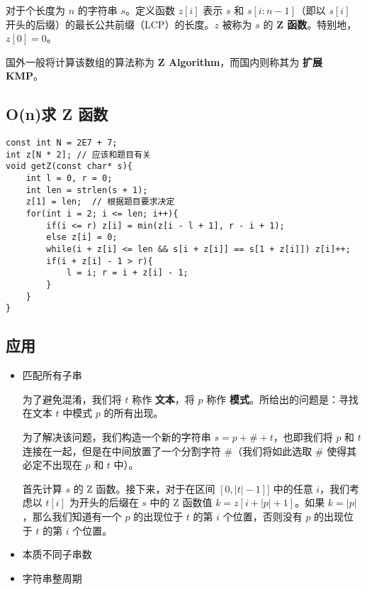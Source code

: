 对于个长度为 $n$ 的字符串 $s$。定义函数 $z[i]$ 表示 $s$ 和 $s[i:n-1]$（即以 $s[i]$ 开头的后缀）的最长公共前缀（LCP）的长度。$z$ 被称为 $s$ 的 \textbf{Z 函数}。特别地，$z[0] = 0$。

国外一般将计算该数组的算法称为 \textbf{Z Algorithm}，而国内则称其为 \textbf{扩展 KMP}。

\subsection{O(n)求 Z 函数}
\begin{lstlisting}
const int N = 2E7 + 7;
int z[N * 2]; // 应该和题目有关
void getZ(const char* s){
    int l = 0, r = 0;
    int len = strlen(s + 1);
    z[1] = len;  // 根据题目要求决定
    for(int i = 2; i <= len; i++){
        if(i <= r) z[i] = min(z[i - l + 1], r - i + 1);
        else z[i] = 0;
        while(i + z[i] <= len && s[i + z[i]] == s[1 + z[i]]) z[i]++;
        if(i + z[i] - 1 > r){
            l = i; r = i + z[i] - 1;
        }
    }
}
\end{lstlisting}

\subsection{应用}
\begin{itemize}
	\item 匹配所有子串
	
		为了避免混淆，我们将 $t$ 称作 \textbf{文本}，将 $p$ 称作 \textbf{模式}。所给出的问题是：寻找在文本 $t$ 中模式 $p$ 的所有出现。
		
		为了解决该问题，我们构造一个新的字符串 $s = p + \# + t$，也即我们将 $p$ 和 $t$ 连接在一起，但是在中间放置了一个分割字符 $\#$（我们将如此选取 $\#$ 使得其必定不出现在 $p$ 和 $t$ 中）。
		
		首先计算 $s$ 的 Z 函数。接下来，对于在区间 $[0, |t| - 1]]$ 中的任意 $i$，我们考虑以 $t[i]$ 为开头的后缀在 $s$ 中的 Z 函数值 $k=z[i + |p| + 1]$。如果 $k = |p|$，那么我们知道有一个 $p$ 的出现位于 $t$ 的第 $i$ 个位置，否则没有 $p$ 的出现位于 $t$ 的第 $i$ 个位置。
	\item 本质不同子串数
	\item 字符串整周期
\end{itemize}
